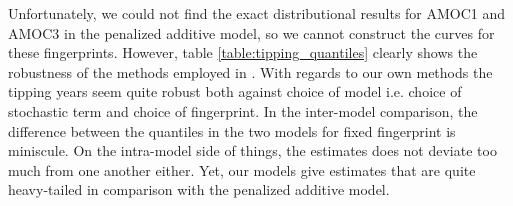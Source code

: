 Unfortunately, we could not find the exact distributional results for AMOC1 and AMOC3 in the penalized additive model, so we cannot construct the curves for these fingerprints. However, table \ref{table:tipping_quantiles} clearly shows the robustness of the methods employed in \cite{Ditlevsen2023}. With regards to our own methods the tipping years seem quite robust both against choice of model i.e. choice of stochastic term and choice of fingerprint. In the inter-model comparison, the difference between the quantiles in the two models for fixed fingerprint is miniscule. On the intra-model side of things, the estimates does not deviate too much from one another either. Yet, our models give estimates that are quite heavy-tailed in comparison with the penalized additive model. 
